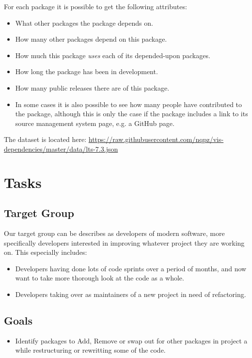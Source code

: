 \documentclass[a4paper,12pt]{article}
\begin{document}
For each package it is possible to get the following attributes:

\begin{itemize}
\item What other packages the package depends on.
\item How many other packages depend on this package.
\item How much this package \emph{uses} each of its depended-upon
packages.
\item How long the package has been in development.
\item How many public releases there are of this package.
\item In some cases it is also possible to see how many people have contributed
to the package, although this is only the case if the package includes a link to
its source management system page, e.g. a GitHub page.
\end{itemize}

The dataset is located here:
\url{https://raw.githubusercontent.com/nqpz/vis-dependencies/master/data/lts-7.3.json}

\section{Tasks}

\subsection{Target Group}

Our target group can be describes as developers of modern software, more
specifically developers interested in improving whatever project they are
working on.  This especially includes:

\begin{itemize}
\item Developers having done lots of code sprints over a period of months, and
now want to take more thorough look at the code as a whole.
\item Developers taking over as maintainers of a new project in need of
refactoring.
\end{itemize}

\subsection{Goals}

\begin{itemize}
\item Identify packages to Add, Remove or swap out for other packages in project a while restructuring or rewritting some of the code.
\end{itemize}
\end{document}
